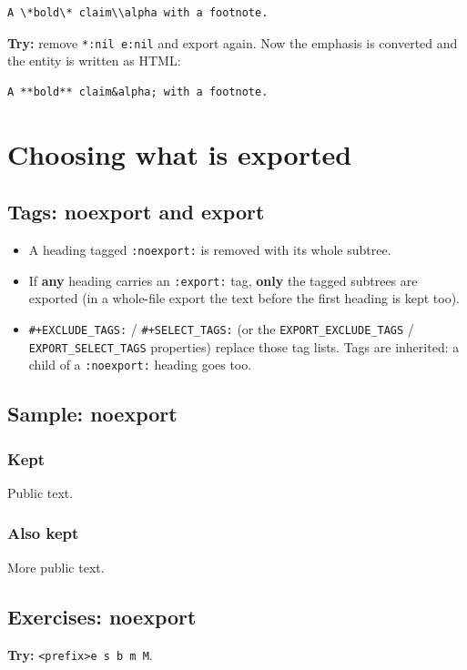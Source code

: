 \begin{verbatim}
A \*bold\* claim\\alpha with a footnote.
\end{verbatim}

\textbf{Try:} remove \texttt{*:nil e:nil} and export again. Now the emphasis is
converted and the entity is written as HTML:

\begin{verbatim}
A **bold** claim&alpha; with a footnote.
\end{verbatim}
\section{Choosing what is exported}
\label{sec:org9320ec8}
\subsection{Tags: noexport and export}
\label{sec:org15298e3}
\begin{itemize}
\item A heading tagged \texttt{:noexport:} is removed with its whole subtree.
\item If \textbf{any} heading carries an \texttt{:export:} tag, \textbf{only} the tagged subtrees
are exported (in a whole-file export the text before the first heading
is kept too).
\item \texttt{\#+EXCLUDE\_TAGS:} / \texttt{\#+SELECT\_TAGS:} (or the \texttt{EXPORT\_EXCLUDE\_TAGS} /
\texttt{EXPORT\_SELECT\_TAGS} properties) replace those tag lists. Tags are
inherited: a child of a \texttt{:noexport:} heading goes too.
\end{itemize}
\subsection{Sample: noexport}
\label{sec:orgc673174}
\subsubsection{Kept}
\label{sec:orgb2d4fbd}
Public text.
\subsubsection{Also kept}
\label{sec:orga176ef6}
More public text.
\subsection{Exercises: noexport}
\label{sec:org305e714}
\textbf{Try:} \texttt{<prefix>e s b m M}.

